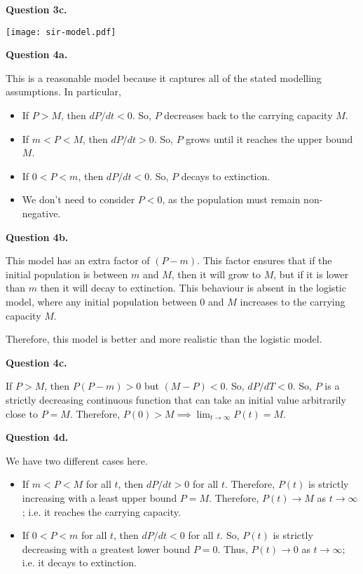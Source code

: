 \documentclass[11pt]{penrose}
\newenvironment{problem}[2][Question]{\textbf{#1 #2.}\par}{}
\begin{document}
\begin{problem}{3c}
    \begin{center}
        \texttt{[image: sir-model.pdf]}
    \end{center}
\end{problem}

\begin{problem}{4a}
    This is a reasonable model because it captures all of the stated modelling assumptions. In particular,
    \begin{itemize}
        \item If $P > M$, then $dP/dt < 0$. So, $P$ decreases back to the carrying capacity $M$.
        \item If $m < P < M$, then $dP/dt > 0$. So, $P$ grows until it reaches the upper bound $M$.
        \item If $0 < P < m$, then $dP/dt < 0$. So, $P$ decays to extinction.
        \item We don't need to consider $P < 0$, as the population must remain non-negative.
    \end{itemize}
\end{problem}

\begin{problem}{4b}
    This model has an extra factor of $(P - m)$. This factor ensures that if the initial population is between $m$ and $M$, then it will grow to $M$, but if it is lower than $m$ then it will decay to extinction. This behaviour is absent in the logistic model, where any initial population between $0$ and $M$ increases to the carrying capacity $M$.

    Therefore, this model is better and more realistic than the logistic model.
\end{problem}

\begin{problem}{4c}
    If $P > M$, then $P(P - m) > 0$ but $(M - P) < 0$. So, $dP/dT < 0$. So, $P$ is a strictly decreasing continuous function that can take an initial value arbitrarily close to $P = M$. Therefore, $\displaystyle P(0) > M \implies \lim_{t \to \infty} P(t) = M$.
\end{problem}

\begin{problem}{4d}
    We have two different cases here.
    \begin{itemize}
        \item If $m < P < M$ for all $t$, then $dP/dt > 0$ for all $t$. Therefore, $P(t)$ is strictly increasing with a least upper bound $P = M$. Therefore, $P(t) \to M$ as $t \to \infty$; i.e. it reaches the carrying capacity.
        \item If $0 < P < m$ for all $t$, then $dP/dt < 0$ for all $t$. So, $P(t)$ is strictly decreasing with a greatest lower bound $P = 0$. Thus, $P(t) \to 0$ as $t \to \infty$; i.e. it decays to extinction.
    \end{itemize}
\end{problem}
\end{document}
